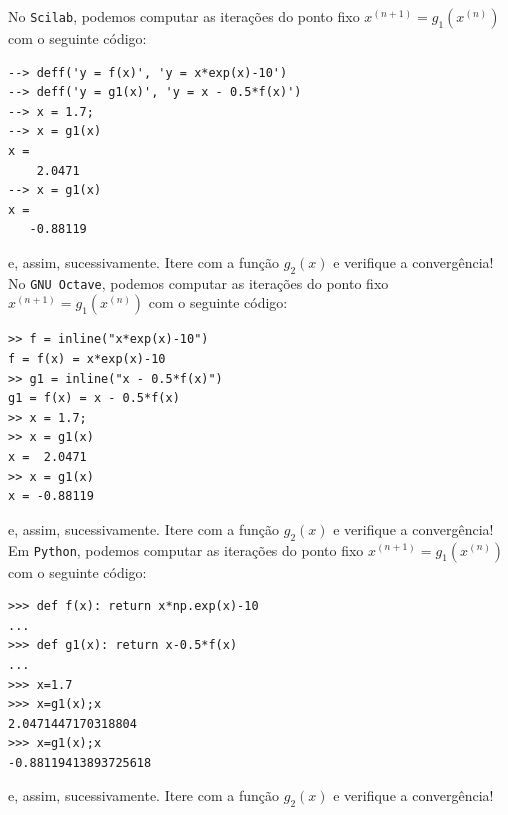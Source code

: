 \begin{ex}
\ifisscilab
No \verb+Scilab+, podemos computar as iterações do ponto fixo $x^{(n+1)} = g_1(x^{(n)})$ com o seguinte código:
\begin{verbatim}
--> deff('y = f(x)', 'y = x*exp(x)-10')
--> deff('y = g1(x)', 'y = x - 0.5*f(x)')
--> x = 1.7;
--> x = g1(x)
x =  
    2.0471
--> x = g1(x)
x = 
   -0.88119
\end{verbatim}
e, assim, sucessivamente. Itere com a função $g_2(x)$ e verifique a convergência!
\fi
\ifisoctave
No \verb+GNU Octave+, podemos computar as iterações do ponto fixo $x^{(n+1)} = g_1(x^{(n)})$ com o seguinte código:
\begin{verbatim}
>> f = inline("x*exp(x)-10")
f = f(x) = x*exp(x)-10
>> g1 = inline("x - 0.5*f(x)")
g1 = f(x) = x - 0.5*f(x)
>> x = 1.7;
>> x = g1(x)
x =  2.0471
>> x = g1(x)
x = -0.88119
\end{verbatim}
e, assim, sucessivamente. Itere com a função $g_2(x)$ e verifique a convergência!
\fi
\ifispython
Em \verb+Python+, podemos computar as iterações do ponto fixo $x^{(n+1)} = g_1(x^{(n)})$ com o seguinte código:
\begin{verbatim}
>>> def f(x): return x*np.exp(x)-10
... 
>>> def g1(x): return x-0.5*f(x)
... 
>>> x=1.7
>>> x=g1(x);x
2.0471447170318804
>>> x=g1(x);x
-0.88119413893725618
\end{verbatim}
e, assim, sucessivamente. Itere com a função $g_2(x)$ e verifique a convergência!
\fi
\end{ex}








